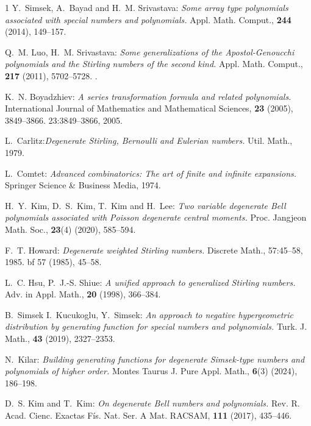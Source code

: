 \documentclass{amsart}
\numberwithin{equation}{section}
\theoremstyle{definition}
\theoremstyle{remark}
\begin{document}
\begin{thebibliography}{1}
{\small {\sc Y.~Simsek, A.~Bayad and H.~M. Srivastava:} {\it Some array type polynomials associated with special numbers and  polynomials.}
Appl. Math. Comput.,  {\bf 244} (2014), 149--157.}

{\small {\sc Q.~M. Luo, H.~M. Srivastava:} {\it Some generalizations of the Apostol-Genoucchi polynomials and the Stirling numbers of the second kind.}
Appl. Math. Comput.,  {\bf 217} (2011), 5702--5728.}
.

{\small {\sc K.~N. Boyadzhiev:} {\it A series transformation formula and related polynomials.}
International Journal of Mathematics and Mathematical Sciences, {\bf 23} (2005), 3849--3866.}
  23:3849--3866, 2005.
  
{\small {\sc L.~Carlitz:}{\it Degenerate Stirling, Bernoulli and Eulerian numbers.}
Util. Math., 1979.}

{\small {\sc  L.~Comtet:} {\it Advanced combinatorics: The art of finite and infinite expansions.}
Springer Science \& Business Media, 1974.}

{\small {\sc H.~Y.~Kim, D.~S.~Kim, T.~Kim and H.~Lee:} {\it Two variable degenerate Bell polynomials associated with Poisson degenerate central moments.}
Proc. Jangjeon Math. Soc., {\bf 23}(4) (2020), 585--594.}

{\small {\sc F.~T. Howard:} {\it Degenerate weighted Stirling numbers.}
Discrete Math., 57:45--58, 1985.  {bf 57} (1985), 45--58.}

{\small {\sc L.~C. Hsu, P.~J.-S. Shiue:} {\it A unified approach to generalized Stirling numbers.}
Adv. in Appl. Math., {\bf 20} (1998), 366--384.}

{\small {\sc B.~Simsek I.~Kucukoglu, Y.~Simsek:} {\it An approach to negative hypergeometric distribution by generating function for special numbers and polynomials.}
Turk. J. Math., {\bf 43} (2019), 2327--2353.}

{\small {\sc N.~Kilar:} {\it Building generating functions for degenerate Simsek-type numbers and polynomials of higher order.}
Montes Taurus J. Pure Appl. Math., {\bf 6}(3) (2024), 186--198.}

{\small {\sc D.~S. Kim and T.~Kim:} {\it On degenerate Bell numbers and polynomials.}
 Rev. R. Acad. Cienc. Exactas F\'{i}s. Nat. Ser. A Mat. RACSAM, {\bf 111} (2017), 435--446.}


\end{thebibliography}
\end{document}
